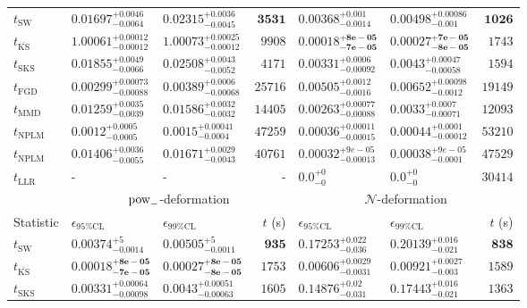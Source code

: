 \begin{tabular}{l|llr|llr}
	\midrule
	$t_{\mathrm{SW}}$ & $0.01697_{-0.0064}^{+0.0046}$ & $0.02315_{-0.0045}^{+0.0036}$ & ${\mathbf{3531}}$ & $0.00368_{-0.0014}^{+0.001}$ & $0.00498_{-0.001}^{+0.00086}$ & ${\mathbf{1026}}$ \\
	$t_{\overline{\mathrm{KS}}}$ & $1.00061_{-0.00012}^{+0.00012}$ & $1.00073_{-0.00012}^{+0.00025}$ & $9908$ & ${\mathbf{0.00018_{-7e-05}^{+8e-05}}}$ & ${\mathbf{0.00027_{-8e-05}^{+7e-05}}}$ & $1743$ \\
	$t_{\mathrm{SKS}}$ & $0.01855_{-0.0066}^{+0.0049}$ & $0.02508_{-0.0052}^{+0.0043}$ & $4171$ & $0.00331_{-0.00092}^{+0.0006}$ & $0.0043_{-0.00058}^{+0.00047}$ & $1594$ \\
	$t_{\mathrm{FGD}}$ & ${\mathbf{0.00299_{-0.00088}^{+0.00073}}}$ & ${\mathbf{0.00389_{-0.00068}^{+0.0006}}}$ & $25716$ & $0.00505_{-0.0016}^{+0.0012}$ & $0.00652_{-0.0012}^{+0.00098}$ & $19149$ \\
	$t_{\mathrm{MMD}}$ & $0.01259_{-0.0039}^{+0.0035}$ & $0.01586_{-0.0032}^{+0.0032}$ & $14405$ & $0.00263_{-0.00088}^{+0.00077}$ & $0.0033_{-0.00071}^{+0.0007}$ & $12093$ \\
\rowcolor{red!35}	$t_{\mathrm{NPLM}}$ & $0.0012_{-0.0005}^{+0.0005}$ & $0.0015_{-0.0004}^{+0.00041}$ & $47259$ & $0.00036_{-0.00015}^{+0.00011}$ & $0.00044_{-0.00012}^{+0.0001}$ & $53210$ \\
\rowcolor{blue!35}	$t_{\mathrm{NPLM}}$ & $0.01406_{-0.0055}^{+0.0036}$ & $0.01671_{-0.0043}^{+0.0029}$ & $40761$ & $0.00032_{-0.00013}^{+9e-05}$ & $0.00038_{-0.0001}^{+9e-05}$ & $47529$ \\
	$t_{\mathrm{LLR}}$ & - & - & - & $0.0_{-0}^{+0}$ & $0.0_{-0}^{+0}$ & $30414$ \\
	\toprule
	\multicolumn{1}{c}{} & \multicolumn{3}{c}{$\rm{pow}_{-}$-deformation} & \multicolumn{3}{c}{$\mathcal{N}$-deformation} \\
	Statistic & $\epsilon_{95\%\mathrm{CL}}$ & $\epsilon_{99\%\mathrm{CL}}$ & $t$ (s) & $\epsilon_{95\%\mathrm{CL}}$ & $\epsilon_{99\%\mathrm{CL}}$ & $t$ (s) \\
	\midrule
	$t_{\mathrm{SW}}$ & $0.00374_{-0.0014}^{+5}$ & $0.00505_{-0.0011}^{+5}$ & ${\mathbf{935}}$ & $0.17253_{-0.036}^{+0.022}$ & $0.20139_{-0.021}^{+0.016}$ & ${\mathbf{838}}$ \\
	$t_{\overline{\mathrm{KS}}}$ & ${\mathbf{0.00018_{-7e-05}^{+8e-05}}}$ & ${\mathbf{0.00027_{-8e-05}^{+8e-05}}}$ & $1753$ & ${\mathbf{0.00606_{-0.0031}^{+0.0029}}}$ & ${\mathbf{0.00921_{-0.003}^{+0.0027}}}$ & $1589$ \\
	$t_{\mathrm{SKS}}$ & $0.00331_{-0.00098}^{+0.00064}$ & $0.0043_{-0.00063}^{+0.00051}$ & $1605$ & $0.14876_{-0.031}^{+0.02}$ & $0.17443_{-0.021}^{+0.016}$ & $1363$ \\

\end{tabular}
